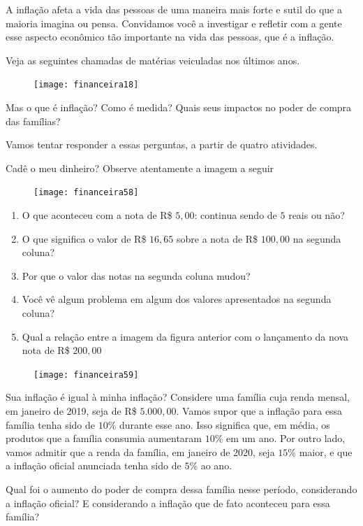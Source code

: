 A inflação afeta a vida das pessoas de uma maneira mais forte e sutil do que a maioria imagina ou pensa. Convidamos você a investigar e refletir com a gente esse aspecto econômico tão importante na vida das pessoas, que é a inflação.

Veja as seguintes chamadas de matérias veiculadas nos últimos anos.

\begin{figure}[H]
\centering

\texttt{[image: financeira18]}
\end{figure}

Mas o que é inflação? Como é medida? Quais seus impactos no poder de compra das famílias?

Vamos tentar responder a essas perguntas, a partir de quatro atividades.

\begin{task}{Cadê o meu dinheiro?}
\label{fin-ativ-29}
Observe atentamente a imagem a seguir

\begin{figure}[H]
\centering

\texttt{[image: financeira58]}
\end{figure}
\begin{enumerate}
\item O que aconteceu com a nota de R\$ $5{,}00$: continua sendo de $5$ reais ou não?
\item O que significa o valor de R\$ $16{,}65$ sobre a nota de R\$ $100{,}00$ na segunda coluna?
\item Por que o valor das notas na segunda coluna mudou?
\item Você vê algum problema em algum dos valores apresentados na segunda coluna?
\item Qual a relação entre a imagem da figura anterior com o lançamento da nova nota de R\$ $200{,}00$
\end{enumerate}
\begin{figure}[H]
\centering

\texttt{[image: financeira59]}
\end{figure}
\end{task}

\begin{task}{Sua inflação é igual à minha inflação?}
\label{fin-ativ-30}
Considere uma família cuja renda mensal, em janeiro de 2019, seja de R\$ $5.000{,}00$. Vamos supor que a inflação para essa família tenha sido de $10$\% durante esse ano. Isso significa que, em média, os produtos que a família consumia aumentaram $10$\% em um ano. Por outro lado, vamos admitir que a renda da família, em janeiro de 2020, seja $15$\% maior, e que a inflação oficial anunciada tenha sido de $5\%$ ao ano.

Qual foi o aumento do poder de compra dessa família nesse período, considerando a inflação oficial? E considerando a inflação que de fato aconteceu para essa família?
\end{task}

